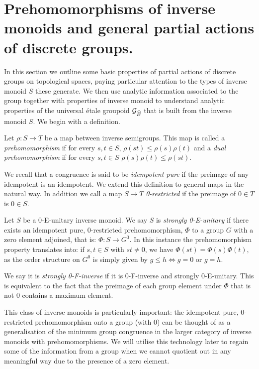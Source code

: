 \begin{example}
\begin{remark}
\end{remark}

\section{Prehomomorphisms of inverse monoids and general partial actions of discrete groups.}\label{Sect:S3} 
In this section we outline some basic properties of partial actions of discrete groups on topological spaces, paying particular attention to the types of inverse monoid $S$ these generate. We then use analytic information associated to the group together with properties of inverse monoid to understand analytic properties of the universal \'etale groupoid $\mathcal{G}_{\widehat{E}}$ that is built from the inverse monoid $S$. We begin with a definition.

\begin{definition}
Let $\rho: S \rightarrow T$ be a map between inverse semigroups. This map is called a \textit{prehomomorphism} if for every $s,t \in S$, $\rho(st) \leq \rho(s)\rho(t)$ and a \textit{dual prehomomorphism} if for every $s,t \in S$ $\rho(s)\rho(t) \leq \rho(st)$.
\end{definition}

We recall that a congruence is said to be \textit{idempotent pure} if the preimage of any idempotent is an idempotent. We extend this definition to general maps in the natural way. In addition we call a map $S \rightarrow T$ \textit{0-restricted} if the preimage of $0 \in T$ is $0 \in S$.

\begin{definition}
Let $S$ be a 0-E-unitary inverse monoid. We say $S$ is \textit{strongly 0-E-unitary} if there exists an idempotent pure, 0-restricted prehomomorphism, $\Phi$ to a group $G$ with a zero element adjoined, that is: $\Phi:S \rightarrow G^{0}$. In this instance the prehomomorphism property translates into: if $s,t \in S$ with $st \not = 0$, we have $\Phi(st)=\Phi(s)\Phi(t)$, as the order structure on $G^{0}$ is simply given by $g \leq h \Leftrightarrow g = 0$ or $g=h$.

We say it is \textit{strongly 0-F-inverse} if it is 0-F-inverse and strongly 0-E-unitary. This is equivalent to the fact that the preimage of each group element under $\Phi$ that is not $0$ contains a maximum element.
\end{definition}

This class of inverse monoids is particularly important: the idempotent pure, 0-restricted prehomomorphism onto a group (with 0) can be thought of as a generalisation of the minimum group congruence in the larger category of inverse monoids with prehomomorphisms. We will utilise this technology later to regain some of the information from a group when we cannot quotient out in any meaningful way due to the presence of a zero element.


\end{example}
